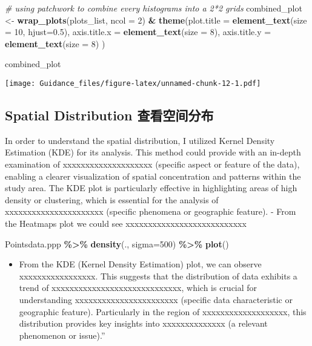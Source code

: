 \documentclass[
]{article}
\newenvironment{Shaded}{\begin{snugshade}}{\end{snugshade}}
\newcommand{\AttributeTok}[1]{\textcolor[rgb]{0.13,0.29,0.53}{#1}}
\newcommand{\CommentTok}[1]{\textcolor[rgb]{0.56,0.35,0.01}{\textit{#1}}}
\newcommand{\DecValTok}[1]{\textcolor[rgb]{0.00,0.00,0.81}{#1}}
\newcommand{\FloatTok}[1]{\textcolor[rgb]{0.00,0.00,0.81}{#1}}
\newcommand{\FunctionTok}[1]{\textcolor[rgb]{0.13,0.29,0.53}{\textbf{#1}}}
\newcommand{\NormalTok}[1]{#1}
\newcommand{\OtherTok}[1]{\textcolor[rgb]{0.56,0.35,0.01}{#1}}
\newcommand{\SpecialCharTok}[1]{\textcolor[rgb]{0.81,0.36,0.00}{\textbf{#1}}}
\providecommand{\tightlist}{%
  \setlength{\itemsep}{0pt}\setlength{\parskip}{0pt}}
\begin{document}
\begin{Shaded}
\begin{Highlighting}[]
\CommentTok{\# using patchwork to combine every histograms into a 2*2 grids}
\NormalTok{combined\_plot }\OtherTok{\textless{}{-}} \FunctionTok{wrap\_plots}\NormalTok{(plots\_list, }\AttributeTok{ncol =} \DecValTok{2}\NormalTok{) }\SpecialCharTok{\&} 
  \FunctionTok{theme}\NormalTok{(}\AttributeTok{plot.title =} \FunctionTok{element\_text}\NormalTok{(}\AttributeTok{size =} \DecValTok{10}\NormalTok{, }\AttributeTok{hjust=}\FloatTok{0.5}\NormalTok{),}
    \AttributeTok{axis.title.x =} \FunctionTok{element\_text}\NormalTok{(}\AttributeTok{size =} \DecValTok{8}\NormalTok{),}
    \AttributeTok{axis.title.y =} \FunctionTok{element\_text}\NormalTok{(}\AttributeTok{size =} \DecValTok{8}\NormalTok{)}
\NormalTok{  )}

\NormalTok{combined\_plot}
\end{Highlighting}
\end{Shaded}

\texttt{[image: Guidance\_files/figure-latex/unnamed-chunk-12-1.pdf]}

\hypertarget{spatial-distribution-ux67e5ux770bux7a7aux95f4ux5206ux5e03}{%
\subsection{Spatial Distribution
查看空间分布}\label{spatial-distribution-ux67e5ux770bux7a7aux95f4ux5206ux5e03}}

In order to understand the spatial distribution, I utilized Kernel
Density Estimation (KDE) for its analysis. This method could provide
with an in-depth examination of xxxxxxxxxxxxxxxxxxxx (specific aspect or
feature of the data), enabling a clearer visualization of spatial
concentration and patterns within the study area. The KDE plot is
particularly effective in highlighting areas of high density or
clustering, which is essential for the analysis of
xxxxxxxxxxxxxxxxxxxxxx (specific phenomena or geographic feature). -
From the Heatmaps plot we could see xxxxxxxxxxxxxxxxxxxxxxxxxxx

\begin{Shaded}
\begin{Highlighting}[]
\NormalTok{Pointsdata.ppp }\SpecialCharTok{\%\textgreater{}\%}
  \FunctionTok{density}\NormalTok{(., }\AttributeTok{sigma=}\DecValTok{500}\NormalTok{) }\SpecialCharTok{\%\textgreater{}\%}
  \FunctionTok{plot}\NormalTok{()}
\end{Highlighting}
\end{Shaded}

\begin{itemize}
\tightlist
\item
  From the KDE (Kernel Density Estimation) plot, we can observe
  xxxxxxxxxxxxxxxxx. This suggests that the distribution of data
  exhibits a trend of xxxxxxxxxxxxxxxxxxxxxxxxxxxxx, which is crucial
  for understanding xxxxxxxxxxxxxxxxxxxxxxx (specific data
  characteristic or geographic feature). Particularly in the region of
  xxxxxxxxxxxxxxxxxxx, this distribution provides key insights into
  xxxxxxxxxxxxxx (a relevant phenomenon or issue).''
\end{itemize}
\end{document}

